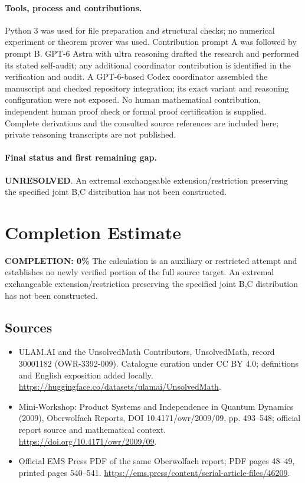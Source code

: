 \documentclass[11pt]{article}
\begin{document}
\paragraph{Tools, process and contributions.}
Python 3 was used for file preparation and structural checks; no numerical experiment or theorem prover was used. Contribution prompt A was followed by prompt B. GPT-6 Astra with ultra reasoning drafted the research and performed its stated self-audit; any additional coordinator contribution is identified in the verification and audit. A GPT-6-based Codex coordinator assembled the manuscript and checked repository integration; its exact variant and reasoning configuration were not exposed. No human mathematical contribution, independent human proof check or formal proof certification is supplied. Complete derivations and the consulted source references are included here; private reasoning transcripts are not published.

\paragraph{Final status and first remaining gap.}
\textbf{UNRESOLVED}. An extremal exchangeable extension/restriction preserving the specified joint B,C distribution has not been constructed.

\section{Completion Estimate}
\noindent\textbf{COMPLETION: 0\%}
The calculation is an auxiliary or restricted attempt and establishes no newly verified portion of the full source target. An extremal exchangeable extension/restriction preserving the specified joint B,C distribution has not been constructed.

\subsection{Sources}
\begin{itemize}
\item[\hypertarget{source:30001182:1}{S1}] ULAM.AI and the UnsolvedMath Contributors, UnsolvedMath, record 30001182 (OWR-3392-009). Catalogue curation under CC BY 4.0; definitions and English exposition added locally.
\url{https://huggingface.co/datasets/ulamai/UnsolvedMath}.
\item[\hypertarget{source:30001182:2}{S2}] Mini-Workshop: Product Systems and Independence in Quantum Dynamics (2009), Oberwolfach Reports, DOI 10.4171/owr/2009/09, pp. 493--548; official report source and mathematical context.
\url{https://doi.org/10.4171/owr/2009/09}.
\item[\hypertarget{source:30001182:3}{S3}] Official EMS Press PDF of the same Oberwolfach report; PDF pages 48--49, printed pages 540--541.
\url{https://ems.press/content/serial-article-files/46209}.
\end{itemize}
\label{end:30001182}
\end{document}
